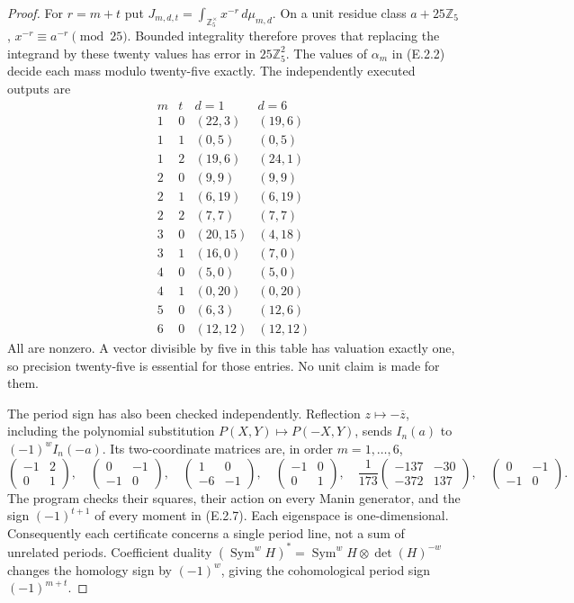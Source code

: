 \begin{proof}
For \(r=m+t\) put
\(J_{m,d,t}=\int_{\mathbb Z_5^\times}x^{-r}\,d\mu_{m,d}\).
On a unit residue class \(a+25\mathbb Z_5\),
\(x^{-r}\equiv a^{-r}\pmod{25}\). Bounded integrality
therefore proves that replacing the integrand by these
twenty values has error in \(25\mathbb Z_5^2\).
The values of \(\alpha_m\) in (E.2.2) decide each mass
modulo twenty-five exactly. The independently executed
outputs are
\[
\begin{array}{cc|cc}
m&t&d=1&d=6\\\hline
1&0&(22,3)&(19,6)\\
1&1&(0,5)&(0,5)\\
1&2&(19,6)&(24,1)\\
2&0&(9,9)&(9,9)\\
2&1&(6,19)&(6,19)\\
2&2&(7,7)&(7,7)\\
3&0&(20,15)&(4,18)\\
3&1&(16,0)&(7,0)\\
4&0&(5,0)&(5,0)\\
4&1&(0,20)&(0,20)\\
5&0&(6,3)&(12,6)\\
6&0&(12,12)&(12,12)
\end{array}                                                   \tag{E.2.7}
\]
All are nonzero. A vector divisible by five in this table
has valuation exactly one, so precision twenty-five is
essential for those entries. No unit claim is made for them.

The period sign has also been checked independently.
Reflection \(z\mapsto-\overline z\), including the
polynomial substitution \(P(X,Y)\mapsto P(-X,Y)\),
sends \(I_n(a)\) to \((-1)^wI_n(-a)\).
Its two-coordinate matrices are, in order \(m=1,\ldots,6\),
\[
 \begin{pmatrix}-1&2\\0&1\end{pmatrix},\quad
 \begin{pmatrix}0&-1\\-1&0\end{pmatrix},\quad
 \begin{pmatrix}1&0\\-6&-1\end{pmatrix},\quad
 \begin{pmatrix}-1&0\\0&1\end{pmatrix},\quad
 \frac1{173}\begin{pmatrix}-137&-30\\-372&137\end{pmatrix},\quad
 \begin{pmatrix}0&-1\\-1&0\end{pmatrix}.
\]
The program checks their squares, their action on every
Manin generator, and the sign \((-1)^{t+1}\) of every
moment in (E.2.7). Each eigenspace is one-dimensional.
Consequently each certificate concerns a single period
line, not a sum of unrelated periods. Coefficient duality
\((\operatorname{Sym}^wH)^*=
\operatorname{Sym}^wH\otimes\det(H)^{-w}\)
changes the homology sign by \((-1)^w\), giving the
cohomological period sign \((-1)^{m+t}\).


\end{proof}
